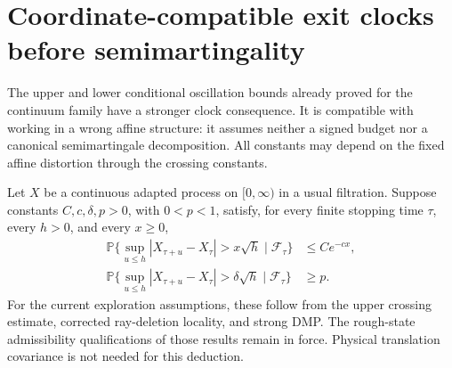 \documentclass[11pt]{article}
\theoremstyle{definition}\newtheorem{definition}[theorem]{Definition}
\theoremstyle{remark}\newtheorem{remark}[theorem]{Remark}
\begin{document}
\section{Coordinate-compatible exit clocks before semimartingality}
\label{sec:adaptive-exit-clocks}

The upper and lower conditional oscillation bounds already proved for the
continuum family have a stronger clock consequence. It is compatible with
working in a wrong affine structure: it assumes neither a signed budget
nor a canonical semimartingale decomposition. All constants may depend
on the fixed affine distortion through the crossing constants.

Let $X$ be a continuous adapted process on $[0,\infty)$ in a usual
filtration. Suppose constants $C,c,\delta,p>0$, with $0<p<1$, satisfy,
for every finite stopping time $\tau$, every $h>0$, and every $x\ge0$,
\begin{align}
 \mathbb P\{\sup_{u\le h}|X_{\tau+u}-X_\tau|>x\sqrt h
       \mid\mathcal F_\tau\}&\le Ce^{-cx},\label{eq:exit-upper-input}\\
 \mathbb P\{\sup_{u\le h}|X_{\tau+u}-X_\tau|>\delta\sqrt h
       \mid\mathcal F_\tau\}&\ge p.\label{eq:exit-lower-input}
\end{align}
For the current exploration assumptions, these follow from the upper
crossing estimate, corrected ray-deletion locality, and strong DMP.
The rough-state admissibility qualifications of those results remain
in force. Physical translation covariance is not needed for this deduction.
\end{document}
